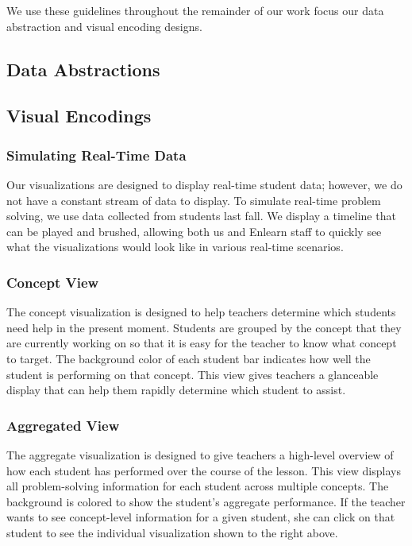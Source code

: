 \documentclass{sigchi}
\begin{document}
We use these guidelines throughout the remainder of our work focus our data abstraction and visual encoding designs.


\subsection{Data Abstractions}





\subsection{Visual Encodings}

\subsubsection{Simulating Real-Time Data}
Our visualizations are designed to display real-time student data; however, we do not have a constant stream of data to display. To simulate real-time problem solving, we use data collected from students last fall. We display a timeline that can be played and brushed, allowing both us and Enlearn staff to quickly see what the visualizations would look like in various real-time scenarios. 

\subsubsection{Concept View}
The concept visualization is designed to help teachers determine which students need help in the present moment. Students are grouped by the concept that they are currently working on so that it is easy for the teacher to know what concept to target. The background color of each student bar indicates how well the student is performing on that concept. This view gives teachers a glanceable display that can help them rapidly determine which student to assist.

\subsubsection{Aggregated View}
The aggregate visualization is designed to give teachers a high-level overview of how each student has performed over the course of the lesson. This view displays all problem-solving information for each student across multiple concepts. The background is colored to show the student's aggregate performance.  If the teacher wants to see concept-level information for a given student, she can click on that student to see the individual visualization shown to the right above.
\end{document}
